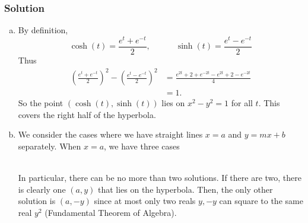 \documentclass{homework}
\begin{document}
    \subsubsection*{Solution}
    \begin{enumerate}[(a)]
        \item By definition,
        \[\cosh(t) = \frac{e^t + e^{-t}}{2}, \quad\quad\quad \sinh(t) = \frac{e^t - e^{-t}}{2}\]
        Thus
        \begin{align*}
            \left(\frac{e^t + e^{-t}}{2}\right)^2 - \left(\frac{e^t - e^{-t}}{2}\right)^2 &= \frac{e^{2t} + 2 + e^{-2t} - e^{2t} + 2 - e^{-2t}}{4} \\
            &= 1.
        \end{align*}
        So the point $(\cosh(t), \sinh(t))$ lies on $x^2 - y^2 = 1$ for all $t$. This covers the right half of the hyperbola.
        
        \item We consider the cases where we have straight lines $x = a$ and $y = mx + b$ separately. When $x = a$, we have three cases
        \begin{figure}[ht!]
            \hfill
            \hfill
        \end{figure} \\
        In particular, there can be no more than two solutions. If there are two, there is clearly one $(a, y)$ that lies on the hyperbola. Then, the only other solution is $(a, -y)$ since at most only two reals $y, -y$ can square to the same real $y^2$ (Fundamental Theorem of Algebra).
        

\end{enumerate}
\end{document}

